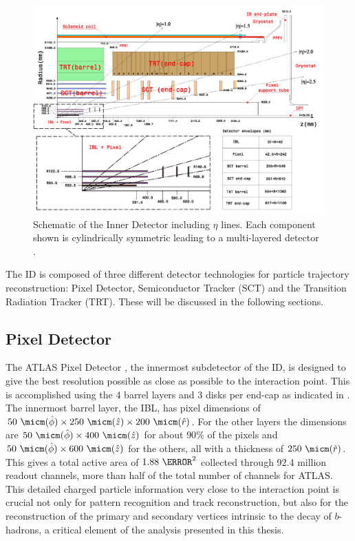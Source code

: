 \begin{figure}[!htbp]
  \begin{center}
    \includegraphics[width=0.8\linewidth]{figures/atlas/inner_detector_schematic}
    \caption{Schematic of the Inner Detector including $\eta$
lines.  Each component shown is cylindrically symmetric leading to a
multi-layered detector \cite{PIX-2018-001}.}
    \label{fig:inner_detector_schematic}
  \end{center}
\end{figure}

The ID is composed of three different detector technologies for particle
trajectory reconstruction: Pixel Detector, Semiconductor Tracker (SCT) and
the Transition Radiation Tracker (TRT).  These will be discussed in the
following sections. 

\subsection{Pixel Detector}

The ATLAS Pixel Detector \cite{PERF-2007-01}, the innermost subdetector of the ID, is designed to
give the best resolution possible as close as possible to the interaction point.
This is accomplished using the 4 barrel layers and 3 disks per end-cap as
indicated in . The innermost barrel
layer, the IBL, has pixel dimensions of $50~\micm(\hat{\phi}) \times 250~\micm
(\hat{z}) \times 200~\micm (\hat{r})$.  For the other layers the dimensions are
$50~\micm (\hat{\phi}) \times 400 ~\micm (\hat{z})$ for about $90\%$ of the pixels
and $50 ~\micm (\hat{\phi}) \times 600 ~\micm (\hat{z})$ for the others, all with a
thickness of $250 ~\micm (\hat{r})$.  This gives a total active area of $1.88~\meter^2$
collected through 92.4 million readout channels, more than half of the total
number of channels for ATLAS. This detailed charged particle information very
close to the interaction point is crucial not only for pattern recognition and
track reconstruction, but also for the reconstruction of the primary and
secondary vertices intrinsic to the decay of $b$-hadrons, a critical element
of the analysis presented in this thesis.

